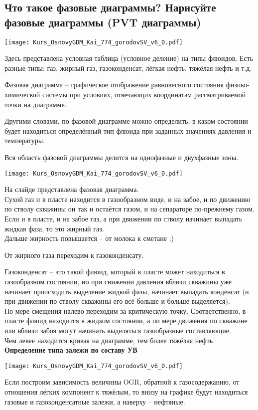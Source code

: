 

\subsection{Что такое фазовые диаграммы? Нарисуйте фазовые диаграммы (PVT диаграммы)}

\texttt{[image: Kurs\_OsnovyGDM\_Kai\_774\_gorodovSV\_v6\_0.pdf]}

Здесь представлена условная таблица (условное деление) на типы флюидов.
Есть разные типы: газ, жирный газ, газоконденсат, лёгкая нефть, тяжёлая нефть и т.д.

Фазовая диаграмма -- графическое отображение равновесного состояния физико-химической системы при условиях, отвечающих координатам рассматриваемой точки на диаграмме.

Другими словами, по фазовой диаграмме можно определить, в каком состоянии будет находиться определённый тип флюида при заданных значениях давления и температуры.

Вся область фазовой диаграммы делится на однофазные и двухфазные зоны.   

\texttt{[image: Kurs\_OsnovyGDM\_Kai\_774\_gorodovSV\_v6\_0.pdf]}

На слайде представлена фазовая диаграмма.
\\

Сухой газ и в пласте находится в газообразном виде, и на забое, и по движению по стволу скважины он так и остаётся газом, и на сепараторе по-прежнему газом.
\\

Если и в пласте, и на забое газ, а при движении по стволу начинает выпадать жидкая фаза, то это жирный газ.
\\

Дальше жирность повышается -- от молока к сметане :)

От жирного газа переходим к газоконденсату.

Газоконденсат -- это такой флюид, который в пласте может находиться в газообразном состоянии, но при снижении давления вблизи скважины уже начинает происходить выделение жидкой фазы, начинает выпадать конденсат (и при движении по стволу скважины его всё больше и больше выделяется).
\\

По мере смещения налево переходим за критическую точку.
Соответственно, в пласте флюид находится в жидком состоянии, а по мере движения по скважине или вблизи забоя могут начинать выделяться газообразные составляющие.
\\

Чем левее находится кривая на диаграмме, тем более тяжёлая нефть.
\\

\textbf{Определение типа залежи по составу УВ}

\texttt{[image: Kurs\_OsnovyGDM\_Kai\_774\_gorodovSV\_v6\_0.pdf]}

Если построим зависимость величины OGR, обратной к газосодержанию, от отношения лёгких компонент к тяжёлым, то внизу на графике будут находиться газовые и газоконденсатные залежи, а наверху -- нефтяные.


